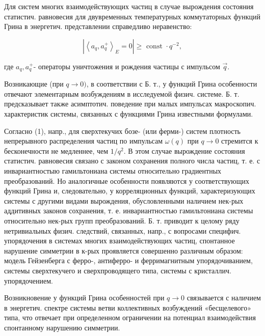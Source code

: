 \documentclass[10pt]{article}
\begin{document}
Для систем многих взаимодействующих частиц в случае вырождения состояния статистич. равновесия для двувременных температурных коммутаторных функций Грина в энергетич. представлении справедливо неравенство:



\[

\left|\left\langle a_{q}, a_{q}^{+}\right\rangle_{E}=0\right| \geqslant \text { const } \cdot q^{-2},

\]



где $a_{q}, a_{q}^{+}$- операторы уничтожения и рождения частицы с импульсом $\vec{q}$.



Возникающие (при $q \rightarrow 0)$, в соответствии с Б. т., у функций Грина особенности отвечают элементарным возбуждениям в исследуемой физич. системе. Б. т. предсказывает также асимптотич. поведение при малых импульсах макроскопич. характеристик системы, связанных с функциями Грина известными формулами.



Согласно (1), напр., для сверхтекучих бозе- (или ферми-) систем плотность непрерывного распределения частиц по импульсам $\omega(q)$ при $q \rightarrow 0$ стремится к бесконечности не медленнее, чем $1 / q^{2}$. В этом случае вырождение состояния статистич. равновесия связано с законом сохранения полного числа частиц, т. е. с инвариантностыю гамильтониана системы относительно градиентных преобразований. Но аналогичные особенности появляются у соответствующих функций Грина и, следовательно, у корреляционных функций, характеризующих системы с другими видами вырождения, обусловленными наличием нек-рых аддитивных законов сохранения, т. е. инвариантностью гамильтониана системы относительно нек-рых групп преобразований. Б. т. приводит к целому ряду нетривиальных физич. следствий, связанных, напр., с вопросами специфич. упорядочения в системах многих взаимодействующих частиц, спонтанное нарушение симметрии в к-рых проявляется совершенно различным образом: модель Гейзенберга с ферро-, антиферро- и ферримагнитным упорядочиванием, системы сверхтекучего и сверхпроводящего типа, системы с кристаллич. упорядочением.



Возникновение у функций Грина особенностей при $q \rightarrow 0$ связывается с наличием в энергетич. спектре системы ветви коллективных возбуждений «бесщелевого» типа, что отвечает при определенном ограничении на потенциал взаимодействия спонтанному нарушению симметрии.
\end{document}

